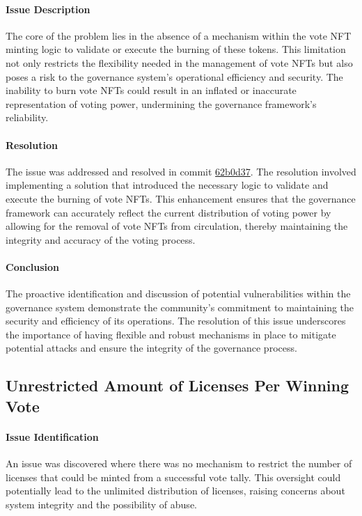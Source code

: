 \documentclass[11pt]{article}
\begin{document}
\paragraph{Issue Description}
The core of the problem lies in the absence of a mechanism within the vote NFT minting logic to validate or execute the burning of these tokens.
This limitation not only restricts the flexibility needed in the management of vote NFTs but also poses a risk to the governance system's operational efficiency and security.
The inability to burn vote NFTs could result in an inflated or inaccurate representation of voting power, undermining the governance framework's reliability.

\paragraph{Resolution}
The issue was addressed and resolved in commit \href{https://github.com/MuesliSwapTeam/muesliswap-atala-onchain-governance/commit/62b0d370f1daf889cce1cc18385a5cabd009b397}{62b0d37}.
The resolution involved implementing a solution that introduced the necessary logic to validate and execute the burning of vote NFTs. This enhancement ensures that the governance framework can accurately reflect the current distribution of voting power by allowing for the removal of vote NFTs from circulation, thereby maintaining the integrity and accuracy of the voting process.


\paragraph{Conclusion}
The proactive identification and discussion of potential vulnerabilities within the governance system demonstrate the community's commitment to maintaining the security and efficiency of its operations. The resolution of this issue underscores the importance of having flexible and robust mechanisms in place to mitigate potential attacks and ensure the integrity of the governance process.

\subsection{Unrestricted Amount of Licenses Per Winning Vote}

\paragraph{Issue Identification}
An issue was discovered where there was no mechanism to restrict the number of licenses that could be minted from a successful vote tally.
This oversight could potentially lead to the unlimited distribution of licenses, raising concerns about system integrity and the possibility of abuse.
\end{document}
